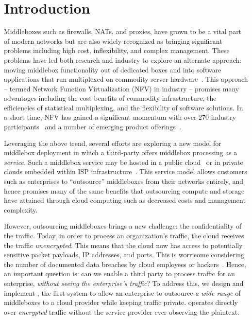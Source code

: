 
\section{Introduction}\label{sec:intro}

Middleboxes such as firewalls, NATs, and proxies, have grown to be a vital part of modern networks but are 
also widely recognized as bringing significant problems including high cost, inflexibility, and complex management.  
These problems have led both research and industry to explore an alternate approach: moving middlebox functionality out of dedicated boxes and into 
software applications that run multiplexed on commodity server hardware~\cite{mb-manifesto,comb,aplomb,opennf,clickos,flowtags,nfv,domain20,opnfv}.
This approach -- termed Network Function Virtualization (NFV) in industry -- promises many advantages including the cost benefits of commodity infrastructure, 
the efficiencies of statistical multiplexing, and the flexibility of software solutions. 
In a short time, NFV has gained a significant momentum with over 270 industry participants~\cite{etsi-nfv} and a number of emerging product offerings~\cite{brocade,dell,juniper}.

Leveraging the above trend, several efforts are exploring a new model for middlebox deployment in which a third-party offers middlebox processing as a  
\emph{service}.
Such a middlebox service may be hosted in a public cloud~\cite{aplomb,zscaler,aryaka} or in private clouds embedded within ISP 
infrastructure~\cite{domain20, telefonica}.  
This service model allows customers such as enterprises to ``outsource'' middleboxes from their networks entirely, and hence promises many of the same 
benefits that outsourcing compute and storage have attained through cloud computing such as decreased costs and management complexity.%

However, outsourcing middleboxes brings a new challenge: the confidentiality of the traffic. 
Today, in order to process an organization's traffic, the cloud receives the traffic {\em unencrypted}.  This means that the cloud 
now has access to potentially sensitive packet payloads,  IP addresses, and ports. This is 
worrisome considering the number of documented data breaches by cloud employees or hackers~\cite{PrivacyRecords}.
Hence, an important question is: can we enable a third party to process traffic for an enterprise, {\em without seeing the enterprise's traffic}?
To address this, we design and implement \sys, the first system to allow an enterprise to outsource {\it a wide range} of middleboxes  to a cloud provider while keeping traffic private. 
\sys operates directly over {\it encrypted} traffic without the service provider ever observing the plaintext.


